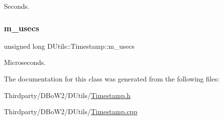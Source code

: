 Seconds. 

\mbox{\label{class_d_utils_1_1_timestamp_afb8947a2cf3b04919f782f4490ca0935}} 
\subsubsection{\texorpdfstring{m\+\_\+usecs}{m\_usecs}}
{\footnotesize\ttfamily unsigned long D\+Utils\+::\+Timestamp\+::m\+\_\+usecs\hspace{0.3cm}{\ttfamily [protected]}}



Microseconds. 



The documentation for this class was generated from the following files\+:\begin{DoxyCompactItemize}
\item 
Thirdparty/\+D\+Bo\+W2/\+D\+Utils/\mbox{\hyperlink{_timestamp_8h}{Timestamp.\+h}}\item 
Thirdparty/\+D\+Bo\+W2/\+D\+Utils/\mbox{\hyperlink{_timestamp_8cpp}{Timestamp.\+cpp}}\end{DoxyCompactItemize}
